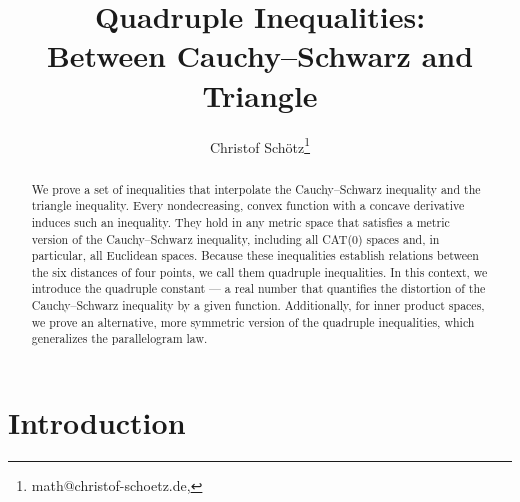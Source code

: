 \documentclass{article}
\title{Quadruple Inequalities:\\Between Cauchy--Schwarz and Triangle}
\date{}
\author[1,2]{Christof Schötz\thanks{math@christof-schoetz.de, \orcidthanks{0000-0003-3528-4544}}}
\affil[1]{Potsdam Institute for Climate Impact Research}
\affil[2]{Technical University of Munich}
\begin{document}
%
\maketitle
%
\begin{abstract}
We prove a set of inequalities that interpolate the Cauchy--Schwarz inequality and the triangle inequality. Every nondecreasing, convex function with a concave derivative induces such an inequality. They hold in any metric space that satisfies a metric version of the Cauchy--Schwarz inequality, including all CAT(0) spaces and, in particular, all Euclidean spaces. Because these inequalities establish relations between the six distances of four points, we call them quadruple inequalities. In this context, we introduce the quadruple constant --- a real number that quantifies the distortion of the Cauchy--Schwarz inequality by a given function. Additionally, for inner product spaces, we prove an alternative, more symmetric version of the quadruple inequalities, which generalizes the parallelogram law.%
\end{abstract}
%
\tableofcontents
%
%
%
\section{Introduction}
%
%
%
\end{document}
